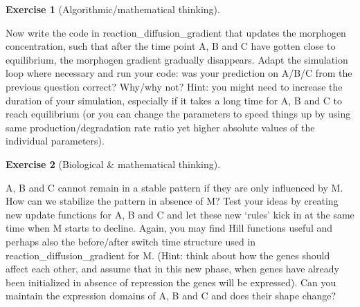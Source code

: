 \documentclass[
  letterpaper,
  DIV=11,
  numbers=noendperiod]{scrreprt}
\theoremstyle{definition}
\newtheorem{exercise}{Exercise}[chapter]
\theoremstyle{remark}
\begin{document}
\begin{exercise}[Algorithmic/mathematical
thinking]\protect\hypertarget{exr-plain}{}\label{exr-plain}

Now write the code in reaction\_diffusion\_gradient that updates the
morphogen concentration, such that after the time point A, B and C have
gotten close to equilibrium, the morphogen gradient gradually
disappears. Adapt the simulation loop where necessary and run your code:
was your prediction on A/B/C from the previous question correct? Why/why
not? Hint: you might need to increase the duration of your simulation,
especially if it takes a long time for A, B and C to reach equilibrium
(or you can change the parameters to speed things up by using same
production/degradation rate ratio yet higher absolute values of the
individual parameters).

\end{exercise}

\begin{exercise}[Biological \& mathematical
thinking]\protect\hypertarget{exr-plain}{}\label{exr-plain}

A, B and C cannot remain in a stable pattern if they are only influenced
by M. How can we stabilize the pattern in absence of M? Test your ideas
by creating new update functions for A, B and C and let these new
`rules' kick in at the same time when M starts to decline. Again, you
may find Hill functions useful and perhaps also the before/after switch
time structure used in reaction\_diffusion\_gradient for M. (Hint: think
about how the genes should affect each other, and assume that in this
new phase, when genes have already been initialized in absence of
repression the genes will be expressed). Can you maintain the expression
domains of A, B and C and does their shape change?

\end{exercise}
\end{document}
